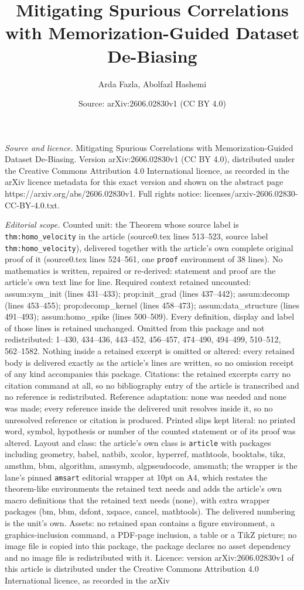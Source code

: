 \documentclass[10pt,a4paper]{amsart}
\title[Mitigating Spurious Correlations with Memorization-Guided Da]{Mitigating Spurious Correlations with Memorization-Guided Dataset De-Biasing}
\author{Arda Fazla, Abolfazl Hashemi}
\date{Source: arXiv:2606.02830v1 (CC BY 4.0)}
\begin{document}
\maketitle

\noindent\emph{Source and licence.} Mitigating Spurious Correlations with Memorization-Guided Dataset De-Biasing. Version arXiv:2606.02830v1 (CC BY 4.0), distributed under the Creative Commons Attribution 4.0 International licence, as recorded in the arXiv licence metadata for this exact version and shown on the abstract page https://arxiv.org/abs/2606.02830v1. Full rights notice: licenses/arxiv-2606.02830-CC-BY-4.0.txt.\par\smallskip

\noindent\textit{Editorial scope.} Counted unit: the Theorem whose source label is \texttt{thm:homo\_velocity} in the article (source0.tex lines 513--523, source label \texttt{thm:homo\_velocity}), delivered together with the article's own complete original proof of it (source0.tex lines 524--561, one \texttt{proof} environment of 38 lines). No mathematics is written, repaired or re-derived: statement and proof are the article's own text line for line. Required context retained uncounted: assum:sym\_init (lines 431--433); prop:init\_grad (lines 437--442); assum:decomp (lines 453--455); prop:decomp\_kernel (lines 458--473); assum:data\_structure (lines 491--493); assum:homo\_spike (lines 500--509). Every definition, display and label of those lines is retained unchanged. Omitted from this package and not redistributed: 1--430, 434--436, 443--452, 456--457, 474--490, 494--499, 510--512, 562--1582. Nothing inside a retained excerpt is omitted or altered: every retained body is delivered exactly as the article's lines are written, so no omission receipt of any kind accompanies this package. Citations: the retained excerpts carry no citation command at all, so no bibliography entry of the article is transcribed and no reference is redistributed. Reference adaptation: none was needed and none was made; every reference inside the delivered unit resolves inside it, so no unresolved reference or citation is produced. Printed slips kept literal: no printed word, symbol, hypothesis or number of the counted statement or of its proof was altered. Layout and class: the article's own class is \texttt{article} with packages including geometry, babel, natbib, xcolor, hyperref, mathtools, booktabs, tikz, amsthm, bbm, algorithm, amssymb, algpseudocode, amsmath; the wrapper is the lane's pinned \texttt{amsart} editorial wrapper at 10pt on A4, which restates the theorem-like environments the retained text needs and adds the article's own macro definitions that the retained text needs (none), with extra wrapper packages (bm, bbm, dsfont, xspace, cancel, mathtools). The delivered numbering is the unit's own. Assets: no retained span contains a figure environment, a graphics-inclusion command, a PDF-page inclusion, a table or a TikZ picture; no image file is copied into this package, the package declares no asset dependency and no image file is redistributed with it. Licence: version arXiv:2606.02830v1 of this article is distributed under the Creative Commons Attribution 4.0 International licence, as recorded in the arXiv 
\end{document}
